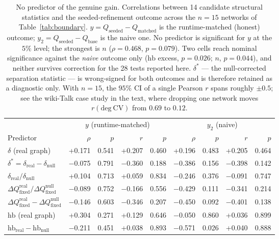 \begin{table}[t]
\centering
\setlength{\tabcolsep}{5pt}
\caption{No predictor of the genuine gain. Correlations between 14 candidate structural statistics
and the seeded-refinement outcome across the $n=15$ networks of Table~\ref{tab:boundary}.
$y = Q_{\mathrm{seeded}} - Q_{\mathrm{matched}}$ is the runtime-matched (honest) outcome;
$y_2 = Q_{\mathrm{seeded}} - Q_{\mathrm{base}}$ is the naive one. No predictor is significant for
$y$ at the $5\%$ level; the strongest is $n$ ($\rho=0.468$, $p=0.079$). Two cells reach nominal
significance against the \emph{naive} outcome only ($\mathrm{hb}$ excess, $p=0.026$; $n$, $p=0.044$), and
neither survives correction for the 28 tests reported here. $\delta^{\ast}$ --- the null-corrected
separation statistic --- is wrong-signed for both outcomes and is therefore retained as a diagnostic
only. With $n=15$, the $95\%$ CI of a single Pearson $r$ spans roughly $\pm 0.5$; see the wiki-Talk
case study in the text, where dropping one network moves $r(\mathrm{deg\ CV})$ from $0.69$ to $0.12$.}
\label{tab:predictors}
\footnotesize
\begin{tabular}{lrrrrrrrr}
\toprule
 & \multicolumn{4}{c}{$y$ (runtime-matched)} & \multicolumn{4}{c}{$y_2$ (naive)} \\
\cmidrule(lr){2-5}\cmidrule(lr){6-9}
Predictor & $\rho$ & $p$ & $r$ & $p$ & $\rho$ & $p$ & $r$ & $p$ \\
\midrule
$\delta$ (real graph) & +0.171 & 0.541 & +0.207 & 0.460 & +0.196 & 0.483 & +0.205 & 0.464 \\
$\delta^{\ast}=\delta_{\mathrm{real}}-\delta_{\mathrm{null}}$ & $-$0.075 & 0.791 & $-$0.360 & 0.188 & $-$0.386 & 0.156 & $-$0.398 & 0.142 \\
$\delta_{\mathrm{real}}/\delta_{\mathrm{null}}$ & +0.104 & 0.713 & +0.059 & 0.834 & $-$0.246 & 0.376 & $-$0.091 & 0.747 \\
$\Delta Q_{\mathrm{fixed}}^{\mathrm{real}}/\Delta Q_{\mathrm{fixed}}^{\mathrm{null}}$ & $-$0.089 & 0.752 & $-$0.166 & 0.556 & $-$0.429 & 0.111 & $-$0.341 & 0.214 \\
$\Delta Q_{\mathrm{fixed}}^{\mathrm{real}}-\Delta Q_{\mathrm{fixed}}^{\mathrm{null}}$ & $-$0.146 & 0.603 & $-$0.346 & 0.207 & $-$0.450 & 0.092 & $-$0.401 & 0.138 \\
$\mathrm{hb}$ (real graph) & +0.304 & 0.271 & +0.129 & 0.646 & $-$0.050 & 0.860 & +0.036 & 0.899 \\
$\mathrm{hb}_{\mathrm{real}}-\mathrm{hb}_{\mathrm{null}}$ & $-$0.211 & 0.451 & +0.038 & 0.893 & $-$0.571 & 0.026 & +0.040 & 0.888 \\

\end{tabular}
\end{table}
